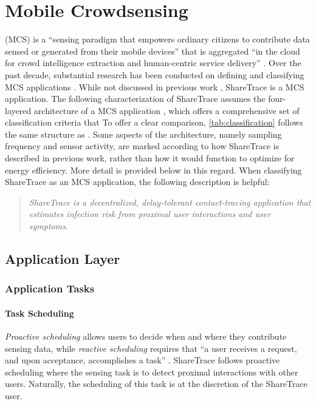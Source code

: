 \section{Mobile Crowdsensing}

 (MCS) is a ``sensing paradigm that empowers ordinary citizens to contribute data sensed or generated from their mobile devices'' that is aggregated  ``in the cloud for crowd intelligence extraction and human-centric service delivery'' \citep{Guo2015}. Over the past decade, substantial research has been conducted on defining and classifying MCS applications \cite[and references therein]{Capponi2019, Guo2015}. While not discussed in previous work \cite{Ayday2020, Ayday2021}, ShareTrace is a MCS application. The following characterization of ShareTrace assumes the four-layered architecture of a MCS application \cite{Capponi2019}, which offers a comprehensive set of classification criteria that To offer a clear comparison, \cref{tab:classification} follows the same structure as \citet{Capponi2019}. Some aspects of the architecture, namely sampling frequency and sensor activity, are marked according to how ShareTrace is described in previous work, rather than how it would function to optimize for energy efficiency. More detail is provided below in this regard. When classifying ShareTrace as an MCS application, the following description is helpful:
\begin{quote}
  \emph{ShareTrace is a decentralized, delay-tolerant contact-tracing application that estimates infection risk from proximal user interactions and user symptoms.}
\end{quote}

\subsection{Application Layer}

\subsubsection{Application Tasks}

\paragraph{Task Scheduling}

\emph{Proactive scheduling} allows users to decide when and where they contribute sensing data, while \emph{reactive scheduling} requires that ``a user receives a request, and upon acceptance, accomplishes a task'' \cite{Capponi2019}. ShareTrace follows proactive scheduling where the sensing task is to detect proximal interactions with other users. Naturally, the scheduling of this task is at the discretion of the ShareTrace user.

